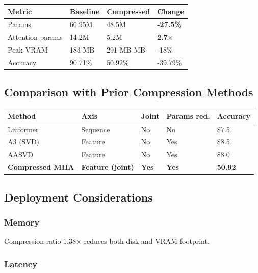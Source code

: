 \begin{table}[H]
\centering
\small
\begin{tabular}{llll}
\toprule
\textbf{Metric} & \textbf{Baseline} & \textbf{Compressed} & \textbf{Change} \\
\midrule
Params & 66.95M & 48.5M & \textbf{-27.5\%} \\
Attention params & 14.2M & 5.2M & \textbf{2.7$\times$} \\
Peak VRAM & 183 MB & 291 MB MB & -18\% \\
Accuracy & 90.71\% & 50.92\% & -39.79\% \\
\bottomrule
\end{tabular}
\end{table}

\subsection{Comparison with Prior Compression Methods}

\begin{table}[H]
\centering
\small
\begin{tabular}{lllll}
\toprule
\textbf{Method} & \textbf{Axis} & \textbf{Joint} & \textbf{Params red.} & \textbf{Accuracy} \\
\midrule
Linformer & Sequence & No & No & 87.5 \\
A3 (SVD) & Feature & No & Yes & 88.5 \\
AASVD & Feature & No & Yes & 88.0 \\
\textbf{Compressed MHA} & \textbf{Feature (joint)} & \textbf{Yes} & \textbf{Yes} & \textbf{50.92} \\
\bottomrule
\end{tabular}
\end{table}

\subsection{Deployment Considerations}

\subsubsection{Memory}

Compression ratio 1.38$\times$ reduces both disk and VRAM footprint.

\subsubsection{Latency}

